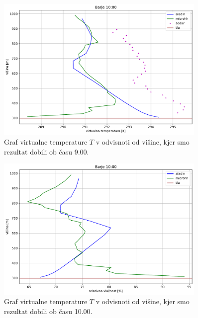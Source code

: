 \documentclass[mat2, tisk]{fmfdelo}
\begin{document}
\begin{figure}[h!]
  \centering
  \includegraphics[width=0.9\textwidth]{rezultati/tv_barje_long_5.pdf}
  \caption{Graf virtualne temperature $T$ v odvisnoti od višine, kjer smo 
  rezultat dobili ob času 9.00.}
  \label{fig:barje_T4}
\end{figure}

\begin{figure}[h!]
  \centering
  \includegraphics[width=0.9\textwidth]{rezultati/rh_barje_long_5.pdf}
  \caption{Graf virtualne temperature $T$ v odvisnoti od višine, kjer smo 
  rezultat dobili ob času 10.00.}
  \label{fig:barje_T5}
\end{figure}
\end{document}
